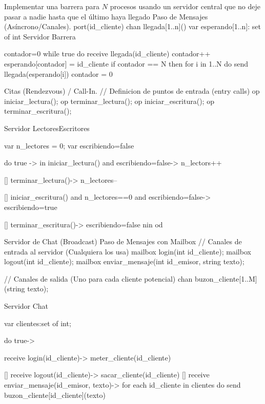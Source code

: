 Implementar una barrera para
$N$ procesos usando un servidor central que no deje pasar a 
nadie hasta que el último haya llegado
Paso de Mensajes (Asíncrono/Canales).
port(id_cliente)
chan llegada[1..n]()
var esperando[1..n]: set of int
Servidor Barrera{
    contador=0
    while true do
    receive llegada(id_cliente)
    contador++
    esperando[contador] = id_cliente
    if contador == N then
        for i in 1..N do
            send llegada(esperando[i])
        contador = 0  
    
}

Citas (Rendezvous) / Call-In.
// Definicion de puntos de entrada (entry calls)
op iniciar_lectura();
op terminar_lectura();
op iniciar_escritura();
op terminar_escritura();

Servidor LectoresEscritores{
    var n_lectores = 0;
    var escribiendo=false

    do true ->
        in iniciar_lectura() and escribiendo=false->
            n_lectors++
        
        [] terminar_lectura()->
            n_lectores--
        
        [] iniciar_escritura() and n_lectores==0 and escribiendo=false->
            escribiendo=true
        
        [] terminar_escritura()->
            escribiendo=false
        nin
    od

}

Servidor de Chat (Broadcast) Paso de Mensajes con Mailbox
// Canales de entrada al servidor (Cualquiera los usa)
mailbox login(int id_cliente);
mailbox logout(int id_cliente);
mailbox enviar_mensaje(int id_emisor, string texto); 

// Canales de salida (Uno para cada cliente potencial)
chan buzon_cliente[1..M](string texto);

Servidor Chat{
    var clientes:set of int;

    do true->

        receive login(id_cliente)->
            meter_cliente(id_cliente)

        [] receive logout(id_cliente)->
            sacar_cliente(id_cliente)
        [] receive enviar_mensaje(id_emisor, texto)->
            for each id_cliente in clientes do
                send buzon_cliente[id_cliente](texto)
    
}







